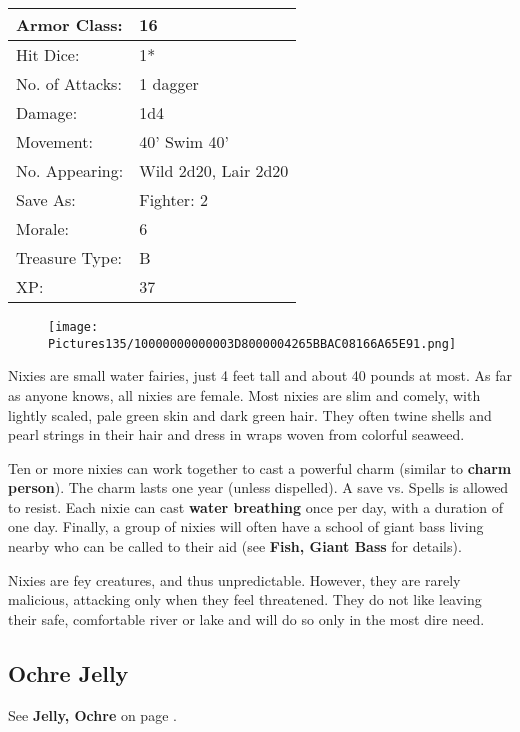 \documentclass[a4paper,twoside,openany,10pt]{book}
\begin{document}
\begin{multicols}{2}
\begin{tabularx}{0.50\textwidth}{@{}lX@{}}
Armor Class: & 16 \\\hline
Hit Dice: & 1* \\\hline
No. of Attacks: & 1 dagger \\\hline
Damage: & 1d4 \\\hline
Movement: & 40' Swim 40' \\\hline
No. Appearing: & Wild 2d20, Lair 2d20 \\\hline
Save As: & Fighter: 2 \\\hline
Morale: & 6 \\\hline
Treasure Type: & B \\\hline
XP: & 37 \\\hline
\end{tabularx}\medskip

\begin{wrapfigure}{l}{0.25\textwidth}
	\texttt{[image: Pictures135/10000000000003D8000004265BBAC08166A65E91.png]}
\end{wrapfigure}

Nixies are small water fairies, just 4 feet tall and about 40 pounds at most. As far as anyone knows, all nixies are female. Most nixies are slim and comely, with lightly scaled, pale green skin and dark green hair. They often twine shells and pearl strings in their hair and dress in wraps woven from colorful seaweed.

Ten or more nixies can work together to cast a powerful charm (similar to \textbf{charm person}). The charm lasts one year (unless dispelled). A save vs. Spells is allowed to resist. Each nixie can cast \textbf{water breathing }once per day, with a duration of one day. Finally, a group of nixies will often have a school of giant bass living nearby who can be called to their aid (see \textbf{Fish, Giant Bass} for details).

Nixies are fey creatures, and thus unpredictable. However, they are rarely malicious, attacking only when they feel threatened. They do not like leaving their safe, comfortable river or lake and will do so only in the most dire need.

\subsection*{Ochre Jelly}\label{ochre-jelly}

See \textbf{Jelly, Ochre }on page
\hyperlink{jelly-ochre}{\pageref{jelly-ochre}}.


\end{multicols}
\end{document}
